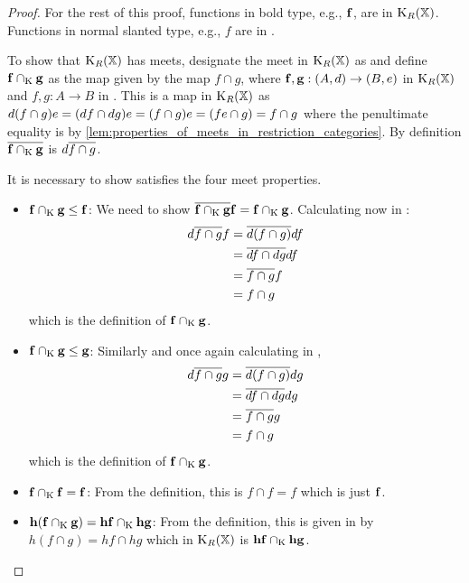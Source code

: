 \begin{proof}
  For the rest of this proof, functions in bold type, e.g., $\mathbf{f}$, are in $\text{K}_{R}(\mathbb{X})$.
  Functions in normal slanted type, e.g., $f$ are in \X.

  To show that $\text{K}_{R}(\mathbb{X})$ has meets,  designate the meet in $\text{K}_{R}(\mathbb{X})$ as \capspl
  and define $\mathbf{f} \cap_{\text{K}} \mathbf{g}$ as the map given by the \X map $f \cap g$, where
  $\mathbf{f},\mathbf{g}:(A,d)\to(B,e)$ in $\text{K}_{R}(\mathbb{X})$ and $f,g:A\to B$ in \X . This is
  a map in $\text{K}_{R}(\mathbb{X})$ as
  $d(f \cap g)e = (d\hspace{0.1pt} f \cap d\hspace{0.1pt} g) e = (f \cap g) e = (f e \cap g) = f\cap g$
  where the penultimate equality is by
  \ref{lem:properties_of_meets_in_restriction_categories}.
  By definition $\overline{\mathbf{f} \cap_{\text{K}} \mathbf{g} }$ is $d\overline{f\cap g}$.

  It is necessary to show \capspl satisfies the four meet properties.
  \begin{itemize}
    \item{$\mathbf{f}\cap_{\text{K}} \mathbf{g} \le \mathbf{f}$: } We need to show
      $\overline{\mathbf{f} \cap_{\text{K}} \mathbf{g}} \mathbf{f} =  \mathbf{f} \cap_{\text{K}} \mathbf{g}$.  Calculating now in \X:
      \begin{align*}
        d \overline{f \cap g} f&= \overline{d(f\cap g)} d f\\
        & = \overline{d f \cap d g} d f \\
        & = \overline{f \cap g} f \\
        & = f \cap g
      \end{align*}
      which is the definition of $\mathbf{f} \cap_{\text{K}} \mathbf{g}$.
    \item{$\mathbf{f}\cap_{\text{K}} \mathbf{g} \le \mathbf{g}$: } Similarly and once again calculating in \X,
      \begin{align*}
        d \overline{f \cap g} g&= \overline{d(f\cap g)} d g\\
        & = \overline{d f \cap d g} d g \\
        & = \overline{f \cap g} g \\
        & = f \cap g
      \end{align*}
      which is the definition of $\mathbf{f} \cap_{\text{K}} \mathbf{g}$.
    \item{$\mathbf{f}\cap_{\text{K}} \mathbf{f} = \mathbf{f}$: } From the definition, this is $f \cap f = f$ which
      is just $ \mathbf{f}$.
    \item{$\mathbf{h}(\mathbf{f}\cap_{\text{K}} \mathbf{g}) = \mathbf{h}\mathbf{f} \cap_{\text{K}} \mathbf{h}\mathbf{g}$: }
      From the definition, this is given in \X by $ h (f \cap g) =
      h f \cap h g$ which in $\text{K}_{R}(\mathbb{X})$ is $\mathbf{h}\mathbf{f} \cap_{\text{K}} \mathbf{h}\mathbf{g}$.
  \end{itemize}
\end{proof}



